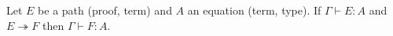 {\begin{code}
\\
%
\\
\>  \AgdaSymbol{:}  \AgdaSymbol{\{}\AgdaSymbol{\}} \AgdaSymbol{\{}\AgdaSymbol{\}} \AgdaSymbol{\{} \AgdaSymbol{:}   \AgdaSymbol{\}} \AgdaSymbol{\{}\AgdaSymbol{\}} \AgdaSymbol{\{}\AgdaSymbol{\}} \AgdaSymbol{\{}\AgdaSymbol{\}}                           \<%
\end{code}
}

\begin{theorem}
Let $E$ be a path (proof, term) and $A$ an equation (term, type).
If $\Gamma \vdash E : A$ and $E \twoheadrightarrow F$ then $\Gamma \vdash F : A$.
\end{theorem}

